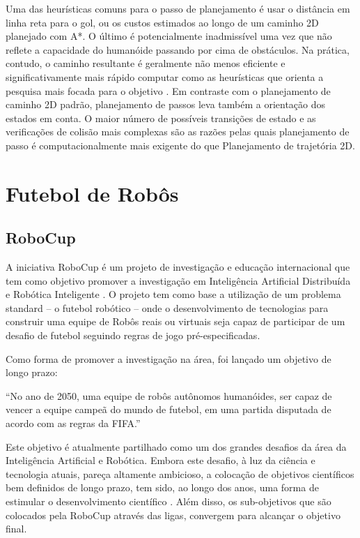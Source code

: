 Uma das heurísticas comuns para o passo de planejamento é usar o distância em linha reta para o gol, ou os custos estimados ao longo de um caminho 2D 
planejado com A*. O último é potencialmente inadmissível uma vez que não reflete a capacidade do humanóide passando por cima de obstáculos.
Na prática, contudo, o caminho resultante é geralmente não menos eficiente e significativamente mais rápido computar como as heurísticas
que orienta a pesquisa mais focada para o objetivo \cite{pgarimort}. Em contraste com o planejamento de caminho 2D padrão,
planejamento de passos leva também a orientação dos estados em conta. O maior número de possíveis transições de estado e as verificações de 
colisão mais complexas são as razões pelas quais planejamento de passo é computacionalmente mais exigente do que Planejamento de trajetória 2D.

\section{Futebol de Robôs}

\subsection{RoboCup}

A iniciativa RoboCup \cite{kitano95} \cite{Kitano97} é um projeto de investigação e educação internacional que tem como objetivo 
promover a investigação em Inteligência Artificial Distribuída e Robótica Inteligente \cite{robocup}. O projeto tem como base a 
utilização de um problema standard – o futebol robótico – onde o desenvolvimento de tecnologias para construir uma equipe de Robôs 
reais ou virtuais seja capaz de participar de um desafio de futebol seguindo regras de jogo pré-especificadas.

Como forma de promover a investigação na área, foi lançado um objetivo de longo prazo: 

“No ano de 2050, uma equipe de robôs autônomos humanóides, ser capaz de vencer a 
equipe campeã do mundo de futebol, em uma partida disputada de acordo com as regras da 
FIFA.” \cite{Kitano97} 

Este objetivo é atualmente partilhado como um dos grandes desafios da área da Inteligência Artificial e Robótica. 
Embora este desafio, à luz da ciência e tecnologia atuais, pareça altamente ambicioso, a colocação de objetivos científicos
bem definidos de longo prazo, tem sido, ao longo dos anos, uma forma de estimular o desenvolvimento científico \cite{robocup}. 
Além disso, os sub-objetivos que são colocados pela RoboCup através das ligas, convergem para alcançar o objetivo final.


